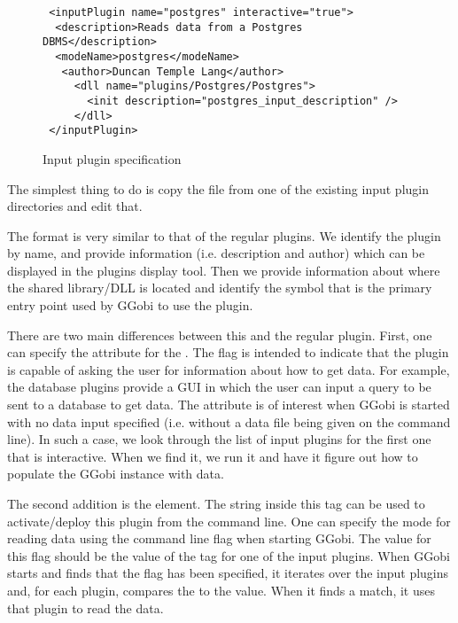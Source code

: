\documentclass{article}
\def\file#1{\href{#1}{\Escape{#1}}}
\begin{document}
\begin{figure}[htbp]
  \begin{center}
    \leavevmode
\begin{verbatim}
 <inputPlugin name="postgres" interactive="true">
  <description>Reads data from a Postgres DBMS</description>
  <modeName>postgres</modeName>
   <author>Duncan Temple Lang</author>
     <dll name="plugins/Postgres/Postgres"> 
       <init description="postgres_input_description" />
     </dll>
 </inputPlugin>    
\end{verbatim}
    \caption{Input plugin specification}
  \end{center}
\end{figure}
The simplest thing to do is copy the \file{plugin.xml} file from one
of the existing input plugin directories and edit that.

The format is very similar to that of the regular plugins.  We
identify the plugin by name, and provide information (i.e. description
and author) which can be displayed in the plugins display tool.  Then
we provide information about where the shared library/DLL is located
and identify the symbol that is the primary entry point used by GGobi
to use the plugin.

  There are two main differences between this and the regular plugin.
First, one can specify the  attribute for
the .  The flag is intended to indicate that the
plugin is capable of asking the user for information about how to get
data. For example, the database plugins provide a GUI in which the
user can input a query to be sent to a database to get data.  The
 attribute is of interest when GGobi is
started with no data input specified (i.e. without a data file being
given on the command line).  In such a case, we look through the list
of input plugins for the first one that is interactive.  When we find
it, we run it and have it figure out how to populate the GGobi
instance with data.

The second addition is the  element.  The string
inside this tag can be used to activate/deploy this plugin from the
command line. One can specify the mode for reading data using the
command line flag  when starting GGobi.  The value for
this flag should be the value of the  tag for one of
the input plugins.  When GGobi starts and finds that the
 flag has been specified, it iterates over the input
plugins and, for each plugin, compares the  to the
 value. When it finds a match, it uses that plugin to
read the data.
\end{document}

